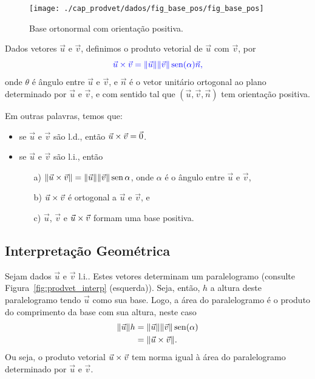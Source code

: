 \begin{figure}[H]
  \centering
  \texttt{[image: ./cap\_prodvet/dados/fig\_base\_pos/fig\_base\_pos]}
  \caption{Base ortonormal com orientação positiva.}
  \label{cap_produtos_sec_cross:fig:base_pos}
\end{figure}

Dados vetores $\vec{u}$ e $\vec{v}$, definimos o produto vetorial de $\vec{u}$ com $\vec{v}$, por
\begin{equation}\label{cap_produtos_sec_cross:eq:def_cross}\color{blue}\vec{u}\times\vec{v} = \|\vec{u}\|\|\vec{v}\|\operatorname{sen}(\alpha)\vec{n},
\end{equation}
onde $\theta$ é ângulo entre $\vec{u}$ e $\vec{v}$, e $\vec{n}$ é o vetor unitário ortogonal ao plano determinado por $\vec{u}$ e $\vec{v}$, e com sentido tal que $(\vec{u}, \vec{v}, \vec{n})$ tem orientação positiva.

Em outras palavras, temos que:
\begin{itemize}
\item se $\vec{u}$ e $\vec{v}$ são l.d., então $\vec{u}\times\vec{v} = \vec{0}$.
\item se $\vec{u}$ e $\vec{v}$ são l.i., então
  \begin{itemize}
  \item[a)] $\|\vec{u}\times\vec{v}\| = \|\vec{u}\|\|\vec{v}\|\operatorname{sen}\alpha$, onde $\alpha$ é o ângulo entre $\vec{u}$ e $\vec{v}$,
  \item[b)] $\vec{u}\times\vec{v}$ é ortogonal a $\vec{u}$ e $\vec{v}$, e
  \item[c)] $\vec{u}$, $\vec{v}$ e $\vec{u}\times\vec{v}$ formam uma base positiva.
  \end{itemize}
\end{itemize}

\subsection{Interpretação Geométrica}

Sejam dados $\vec{u}$ e $\vec{v}$ l.i.. Estes vetores determinam um paralelogramo (consulte Figura~\ref{fig:prodvet_interp} (esquerda)). Seja, então, $h$ a altura deste paralelogramo tendo $\vec{u}$ como sua base. Logo, a área do paralelogramo é o produto do comprimento da base com sua altura, neste caso
\begin{align}
  \|\vec{u}\|h &= \|\vec{u}\|\|\vec{v}\|\operatorname{sen}(\alpha)\\
               &= \|\vec{u}\times\vec{v}\|.
\end{align}
Ou seja, o produto vetorial $\vec{u}\times\vec{v}$ tem norma igual à área do paralelogramo determinado por $\vec{u}$ e $\vec{v}$.

